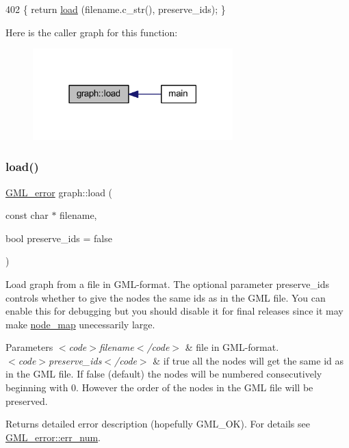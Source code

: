 \begin{DoxyCode}
402     \{ \textcolor{keywordflow}{return} \mbox{\hyperlink{classgraph_ac28cb3468623a480709d3329033d4ec8}{load}} (filename.c\_str(), preserve\_ids); \}
\end{DoxyCode}
Here is the caller graph for this function\+:
\nopagebreak
\begin{figure}[H]
\begin{center}
\leavevmode
\includegraphics[width=219pt]{classgraph_ac28cb3468623a480709d3329033d4ec8_icgraph}
\end{center}
\end{figure}
\mbox{\label{classgraph_a37c17685e1becc66723699d4c9db072b}} 
\subsubsection{\texorpdfstring{load()}{load()}\hspace{0.1cm}{\footnotesize\ttfamily [2/2]}}
{\footnotesize\ttfamily \mbox{\hyperlink{struct_g_m_l__error}{G\+M\+L\+\_\+error}} graph\+::load (\begin{DoxyParamCaption}\item[{const char $\ast$}]{filename,  }\item[{bool}]{preserve\+\_\+ids = {\ttfamily false} }\end{DoxyParamCaption})\hspace{0.3cm}{\ttfamily [inherited]}}

Load graph from a file in G\+M\+L-\/format. The optional parameter {\ttfamily preserve\+\_\+ids} controls whether to give the nodes the same ids as in the G\+ML file. You can enable this for debugging but you should disable it for final releases since it may make {\ttfamily \mbox{\hyperlink{classnode__map}{node\+\_\+map}}} unecessarily large. ~\newline
 
\begin{DoxyParams}{Parameters}
{\em $<$code$>$filename$<$/code$>$} & file in G\+M\+L-\/format. \\
\hline
{\em $<$code$>$preserve\+\_\+ids$<$/code$>$} & if true all the nodes will get the same id as in the G\+ML file. If false (default) the nodes will be numbered consecutively beginning with 0. However the order of the nodes in the G\+ML file will be preserved. \\
\hline
\end{DoxyParams}
\begin{DoxyReturn}{Returns}
detailed error description (hopefully G\+M\+L\+\_\+\+OK). For details see \mbox{\hyperlink{struct_g_m_l__error_a66fe2c5a3d2d40e77ff486007dfe7f76}{G\+M\+L\+\_\+error\+::err\+\_\+num}}. 
\end{DoxyReturn}


